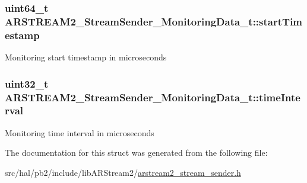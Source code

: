 \subsubsection[{\texorpdfstring{start\+Timestamp}{startTimestamp}}]{\setlength{\rightskip}{0pt plus 5cm}uint64\+\_\+t A\+R\+S\+T\+R\+E\+A\+M2\+\_\+\+Stream\+Sender\+\_\+\+Monitoring\+Data\+\_\+t\+::start\+Timestamp}\hypertarget{struct_a_r_s_t_r_e_a_m2___stream_sender___monitoring_data__t_ad7ac50b9d1b167576422cf4a33809dec}{}\label{struct_a_r_s_t_r_e_a_m2___stream_sender___monitoring_data__t_ad7ac50b9d1b167576422cf4a33809dec}
Monitoring start timestamp in microseconds 
\subsubsection[{\texorpdfstring{time\+Interval}{timeInterval}}]{\setlength{\rightskip}{0pt plus 5cm}uint32\+\_\+t A\+R\+S\+T\+R\+E\+A\+M2\+\_\+\+Stream\+Sender\+\_\+\+Monitoring\+Data\+\_\+t\+::time\+Interval}\hypertarget{struct_a_r_s_t_r_e_a_m2___stream_sender___monitoring_data__t_ad90c1eec185664fad0ec256cb8fc2d04}{}\label{struct_a_r_s_t_r_e_a_m2___stream_sender___monitoring_data__t_ad90c1eec185664fad0ec256cb8fc2d04}
Monitoring time interval in microseconds 

The documentation for this struct was generated from the following file\+:\begin{DoxyCompactItemize}
\item 
src/hal/pb2/include/lib\+A\+R\+Stream2/\hyperlink{arstream2__stream__sender_8h}{arstream2\+\_\+stream\+\_\+sender.\+h}\end{DoxyCompactItemize}
